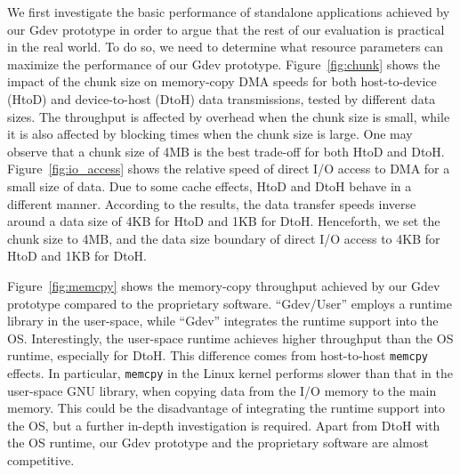 We first investigate the basic performance of standalone applications
achieved by our Gdev prototype in order to argue that the rest of our
evaluation is practical in the real world. 
To do so, we need to determine what resource parameters can maximize the
performance of our Gdev prototype. 
Figure~\ref{fig:chunk} shows the impact of the chunk size on memory-copy
DMA speeds for both host-to-device (HtoD) and device-to-host (DtoH)
data transmissions, tested by different data sizes.
The throughput is affected by overhead when the chunk size is small,
while it is also affected by blocking times when the chunk size is
large.
One may observe that a chunk size of 4MB is the best trade-off
for both HtoD and DtoH.
Figure~\ref{fig:io_access} shows the relative speed of direct I/O
access to DMA for a small size of data. 
Due to some cache effects, HtoD and DtoH behave in a different manner.
According to the results, the data transfer speeds inverse around a
data size of 4KB for HtoD and 1KB for DtoH.
Henceforth, we set the chunk size to 4MB, and the data size boundary of
direct I/O access to 4KB for HtoD and 1KB for DtoH.

Figure~\ref{fig:memcpy} shows the memory-copy throughput achieved
by our Gdev prototype compared to the proprietary software.
``Gdev/User'' employs a runtime library in the user-space, while
``Gdev'' integrates the runtime support into the OS.
Interestingly, the user-space runtime achieves higher throughput than
the OS runtime, especially for DtoH.
This difference comes from host-to-host \texttt{memcpy} effects.
In particular, \texttt{memcpy} in the Linux kernel performs slower than
that in the user-space GNU library, when copying data from the I/O
memory to the main memory.
This could be the disadvantage of integrating the runtime support into
the OS, but a further in-depth investigation is required.
Apart from DtoH with the OS runtime, our Gdev prototype and the
proprietary software are almost competitive.
 
